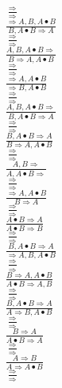 \documentclass[11pt]{article}
\begin{document}
\begin{center}
\bigskip
\\$\frac{\Rightarrow }{\Rightarrow }$
\bigskip
\\$\frac{\Rightarrow A, B, A\bullet B}{B, A\bullet B\Rightarrow A}$
\bigskip
\\$\frac{\Rightarrow }{\Rightarrow }$
\bigskip
\\$\frac{A, B, A\bullet B\Rightarrow }{B\Rightarrow A, A\bullet B}$
\bigskip
\\$\frac{\Rightarrow }{\Rightarrow }$
\bigskip
\\$\frac{\Rightarrow A, A\bullet B}{\Rightarrow B, A\bullet B}$
\bigskip
\\$\frac{\Rightarrow }{\Rightarrow }$
\bigskip
\\$\frac{A, B, A\bullet B\Rightarrow }{B, A\bullet B\Rightarrow A}$
\bigskip
\\$\frac{\Rightarrow }{\Rightarrow }$
\bigskip
\\$\frac{B, A\bullet B\Rightarrow A}{B\Rightarrow A, A\bullet B}$
\bigskip
\\$\frac{\Rightarrow }{\Rightarrow }$
\bigskip
\\$\frac{A, B\Rightarrow }{A, A\bullet B\Rightarrow }$
\bigskip
\\$\frac{\Rightarrow }{\Rightarrow }$
\bigskip
\\$\frac{\Rightarrow A, A\bullet B}{B\Rightarrow A}$
\bigskip
\\$\frac{\Rightarrow }{\Rightarrow }$
\bigskip
\\$\frac{A\bullet B\Rightarrow A}{A\bullet B\Rightarrow B}$
\bigskip
\\$\frac{\Rightarrow }{\Rightarrow }$
\bigskip
\\$\frac{B, A\bullet B\Rightarrow A}{\Rightarrow A, B, A\bullet B}$
\bigskip
\\$\frac{\Rightarrow }{\Rightarrow }$
\bigskip
\\$\frac{B\Rightarrow A, A\bullet B}{A\bullet B\Rightarrow A, B}$
\bigskip
\\$\frac{\Rightarrow }{\Rightarrow }$
\bigskip
\\$\frac{B, A\bullet B\Rightarrow A}{A\Rightarrow B, A\bullet B}$
\bigskip
\\$\frac{\Rightarrow }{\Rightarrow }$
\bigskip
\\$\frac{B\Rightarrow A}{A\bullet B\Rightarrow A}$
\bigskip
\\$\frac{\Rightarrow }{\Rightarrow }$
\bigskip
\\$\frac{A\Rightarrow B}{A\Rightarrow A\bullet B}$
\bigskip
\\$\frac{\Rightarrow }{\Rightarrow }$

\end{center}
\end{document}
